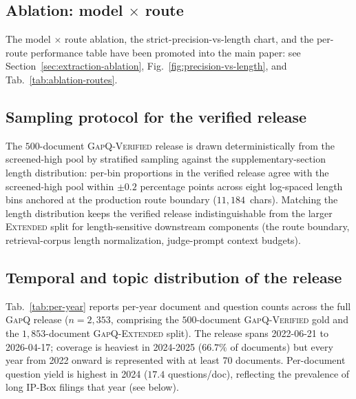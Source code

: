 
\subsection{Ablation: model $\times$ route}
\label{app:extraction:ablations}

The model $\times$ route ablation, the strict-precision-vs-length chart, and the per-route performance table have been promoted into the main paper: see Section~\ref{sec:extraction-ablation}, Fig.~\ref{fig:precision-vs-length}, and Tab.~\ref{tab:ablation-routes}.


\subsection{Sampling protocol for the verified release}
\label{app:extraction:sampling}

The $500$-document \textsc{GapQ-Verified} release is drawn
deterministically from the screened-high pool by stratified sampling
against the supplementary-section length distribution: per-bin
proportions in the verified release agree with the screened-high
pool within $\pm 0.2$ percentage points across eight log-spaced
length bins anchored at the production route boundary
($11{,}184$~chars). Matching the length distribution keeps the
verified release indistinguishable from the larger \textsc{Extended}
split for length-sensitive downstream components (the route
boundary, retrieval-corpus length normalization, judge-prompt
context budgets).


\subsection{Temporal and topic distribution of the release}
\label{app:extraction:distribution}

Tab.~\ref{tab:per-year} reports per-year document and question counts
across the full \textsc{GapQ} release ($n=2{,}353$, comprising the
$500$-document \textsc{GapQ-Verified} gold and the $1{,}853$-document
\textsc{GapQ-Extended} split). The release spans
2022-06-21 to 2026-04-17; coverage is heaviest in 2024-2025
($66.7\%$ of documents) but every year from 2022 onward is represented
with at least 70 documents. Per-document question yield is highest in
2024 ($17.4$ questions/doc), reflecting the prevalence of long IP-Box
filings that year (see below).

